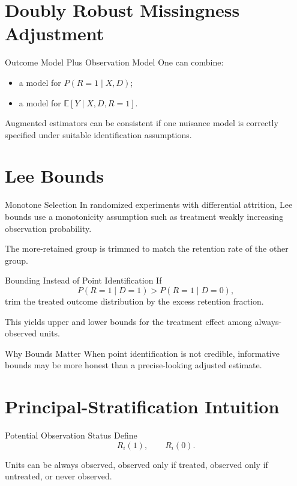\documentclass[aspectratio=169,11pt]{beamer}
\newcommand{\E}{\mathbb{E}}
\begin{document}
\section{Doubly Robust Missingness Adjustment}

\begin{frame}{Outcome Model Plus Observation Model}
One can combine:
\begin{itemize}
\item a model for \(P(R=1\mid X,D)\);
\item a model for \(\E[Y\mid X,D,R=1]\).
\end{itemize}

Augmented estimators can be consistent if one nuisance model is correctly specified under suitable identification assumptions.
\end{frame}

\section{Lee Bounds}

\begin{frame}{Monotone Selection}
In randomized experiments with differential attrition, Lee bounds use a monotonicity assumption such as treatment weakly increasing observation probability.

The more-retained group is trimmed to match the retention rate of the other group.
\end{frame}

\begin{frame}{Bounding Instead of Point Identification}
If
\[
P(R=1\mid D=1)>P(R=1\mid D=0),
\]
trim the treated outcome distribution by the excess retention fraction.

This yields upper and lower bounds for the treatment effect among always-observed units.
\end{frame}

\begin{frame}{Why Bounds Matter}
When point identification is not credible, informative bounds may be more honest than a precise-looking adjusted estimate.
\end{frame}

\section{Principal-Stratification Intuition}

\begin{frame}{Potential Observation Status}
Define
\[
R_i(1),\qquad R_i(0).
\]

Units can be always observed, observed only if treated, observed only if untreated, or never observed.
\end{frame}
\end{document}
